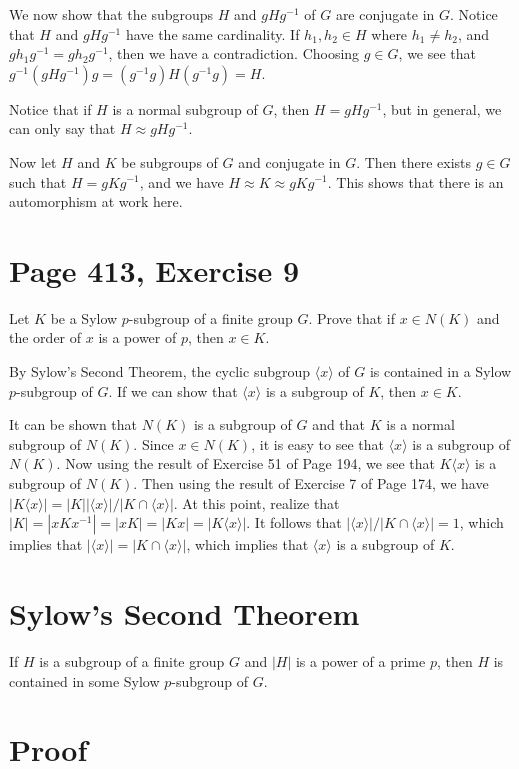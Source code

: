 \documentclass{article}
\begin{document}
We now show that the subgroups $H$ and $gHg^{-1}$ of $G$ are conjugate in $G$.
Notice that $H$ and $gHg^{-1}$ have the same cardinality.  If $h_1,h_2\in H$
where $h_1\neq h_2$, and $gh_1g^{-1}=gh_2g^{-1}$, then we have a contradiction.
Choosing $g\in G$, we see that $g^{-1}(gHg^{-1})g=(g^{-1}g)H(g^{-1}g)=H$.

Notice that if $H$ is a normal subgroup of $G$, then $H=gHg^{-1}$, but
in general, we can only say that $H\approx gHg^{-1}$.

Now let $H$ and $K$ be subgroups of $G$ and conjugate in $G$.
Then there exists $g\in G$ such that $H=gKg^{-1}$, and
we have $H\approx K\approx gKg^{-1}$.  This shows that there
is an automorphism at work here.

\section*{Page 413, Exercise 9}

Let $K$ be a Sylow $p$-subgroup of a finite group $G$.  Prove that if $x\in N(K)$
and the order of $x$ is a power of $p$, then $x\in K$.

By Sylow's Second Theorem, the cyclic subgroup $\langle x\rangle$ of $G$ is
contained in a Sylow $p$-subgroup of $G$.  If we can show that
$\langle x\rangle$ is a subgroup of $K$, then $x\in K$.

It can be shown that $N(K)$ is a subgroup of $G$ and that $K$ is a normal
subgroup of $N(K)$.  Since $x\in N(K)$, it is easy to see that
$\langle x\rangle$ is a subgroup of $N(K)$.  Now using the result of
Exercise 51 of Page 194, we see that $K\langle x\rangle$ is a subgroup of
$N(K)$.  Then using the result of Exercise 7 of Page 174, we have
$|K\langle x\rangle|=|K||\langle x\rangle|/|K\cap\langle x\rangle|$.
At this point, realize that $|K|=|xKx^{-1}|=|xK|=|Kx|=|K\langle x\rangle|$.
It follows that $|\langle x\rangle|/|K\cap\langle x\rangle|=1$, which implies
that $|\langle x\rangle|=|K\cap\langle x\rangle|$, which implies that
$\langle x\rangle$ is a subgroup of $K$.

\section*{Sylow's Second Theorem}

If $H$ is a subgroup of a finite group $G$ and $|H|$ is a power
of a prime $p$, then $H$ is contained in some Sylow $p$-subgroup of $G$.

\section*{Proof}
\end{document}
